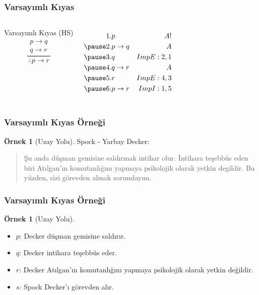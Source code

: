\documentclass[dvipsnames]{beamer}
\theoremstyle{definition}
\theoremstyle{example}
\newtheorem{ornek}[theorem]{Örnek}
\theoremstyle{plain}
\begin{document}
\begin{frame}
  \frametitle{Varsayımlı Kıyas}

  \begin{columns}
    \begin{block}{Varsayımlı Kıyas (HS)}
      \[
      \frac
        {
          \begin{array}{c}
            p \rightarrow q\\
            q \rightarrow r
          \end{array}}
        {
          \therefore p \rightarrow r
        }
      \]
    \end{block}

    \pause
    \begin{eqnarray*}
      1. & p               & A!\\
      \pause
      2. & p \rightarrow q & A\\
      \pause
      3. & q               & ImpE:2,1\\
      \pause
      4. & q \rightarrow r & A\\
      \pause
      5. & r               & ImpE:4,3\\
      \pause
      6. & p \rightarrow r & ImpI:1,5\\
    \end{eqnarray*}
  \end{columns}
\end{frame}

\begin{frame}
  \frametitle{Varsayımlı Kıyas Örneği}

  \begin{ornek}[Uzay Yolu]
    Spock - Yarbay Decker:
    \begin{quote}
      Şu anda düşman gemisine saldırmak intihar olur. İntihara teşebbüs eden
      biri Atılgan'ın komutanlığını yapmaya psikolojik olarak yetkin degildir.
      Bu yüzden, sizi görevden almak zorundayım.
    \end{quote}
  \end{ornek}
\end{frame}

\begin{frame}
  \frametitle{Varsayımlı Kıyas Örneği}

  \begin{ornek}[Uzay Yolu]
    \begin{itemize}
      \item $p$: Decker düşman gemisine saldırır.
      \item $q$: Decker intihara teşebbüs eder.
      \item $r$: Decker Atılgan'ın komutanlığını yapmaya psikolojik olarak
        yetkin değildir.
      \item $s$: Spock Decker'ı görevden alır.
    \end{itemize}
  \end{ornek}
\end{frame}
\end{document}
